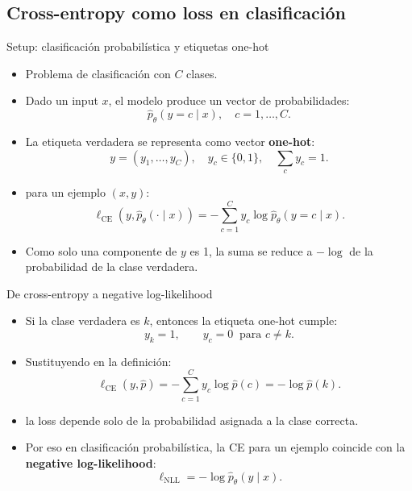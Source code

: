 \subsection{Cross-entropy como loss en clasificación}

\begin{frame}{Setup: clasificación probabilística y etiquetas one-hot}
\begin{itemize}
  \item Problema de clasificación con \(C\) clases.
  \item Dado un input \(x\), el modelo produce un vector de probabilidades:
  \[
    \hat p_\theta(y=c\mid x),\quad c=1,\dots,C.
  \]
  \item La etiqueta verdadera se representa como vector \textbf{one-hot}:
  \[
    y = (y_1,\dots,y_C),\quad y_c\in\{0,1\},\quad \sum_c y_c = 1.
  \]
  \item {} para un ejemplo \((x,y)\):
  \[
    \ell_{\mathrm{CE}}(y,\hat p_\theta(\cdot\mid x))
    = -\sum_{c=1}^C y_c \log \hat p_\theta(y=c\mid x).
  \]
  \item Como solo una componente de \(y\) es 1, la suma se reduce a \(-\log\) de la probabilidad de la clase verdadera.
\end{itemize}
\end{frame}

\begin{frame}{De cross-entropy a negative log-likelihood}
\begin{itemize}
  \item Si la clase verdadera es \(k\), entonces la etiqueta one-hot cumple:
  \[
    y_k = 1,\qquad y_c=0\;\; \text{para } c\neq k.
  \]
  \item Sustituyendo en la definición:
  \[
    \ell_{\mathrm{CE}}(y,\hat p)
    = -\sum_{c=1}^C y_c \log \hat p(c)
    = -\log \hat p(k).
  \]
  \item {} la loss depende solo de la probabilidad asignada a la clase correcta.
  \item Por eso en clasificación probabilística, la CE para un ejemplo coincide con la \textbf{negative log-likelihood}:
  \[
    \ell_{\mathrm{NLL}} = -\log \hat p_\theta(y\mid x).
  \]
\end{itemize}
\end{frame}


